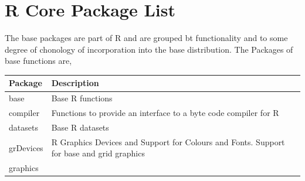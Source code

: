 \documentclass[]{book}
\theoremstyle{definition}
\theoremstyle{definition}
\theoremstyle{definition}
\theoremstyle{remark}
\begin{document}
\section{R Core Package List}\label{r-core-package-list}

The base packages are part of R and are grouped bt functionality and to
some degree of chonology of incorporation into the base distribution.
The Packages of base functions are,

\begin{longtable}[]{@{}ll@{}}
\toprule
\begin{minipage}[b]{0.13\columnwidth}\raggedright\strut
Package\strut
\end{minipage} & \begin{minipage}[b]{0.81\columnwidth}\raggedright\strut
Description\strut
\end{minipage}\tabularnewline
\midrule
\endhead
\begin{minipage}[t]{0.13\columnwidth}\raggedright\strut
base\strut
\end{minipage} & \begin{minipage}[t]{0.81\columnwidth}\raggedright\strut
Base R functions\strut
\end{minipage}\tabularnewline
\begin{minipage}[t]{0.13\columnwidth}\raggedright\strut
compiler\strut
\end{minipage} & \begin{minipage}[t]{0.81\columnwidth}\raggedright\strut
Functions to provide an interface to a byte code compiler for R\strut
\end{minipage}\tabularnewline
\begin{minipage}[t]{0.13\columnwidth}\raggedright\strut
datasets\strut
\end{minipage} & \begin{minipage}[t]{0.81\columnwidth}\raggedright\strut
Base R datasets\strut
\end{minipage}\tabularnewline
\begin{minipage}[t]{0.13\columnwidth}\raggedright\strut
grDevices\strut
\end{minipage} & \begin{minipage}[t]{0.81\columnwidth}\raggedright\strut
R Graphics Devices and Support for Colours and Fonts. Support for base
and grid graphics\strut
\end{minipage}\tabularnewline
\begin{minipage}[t]{0.13\columnwidth}\raggedright\strut
graphics\strut
\end{minipage} & \begin{minipage}[t]{0.81\columnwidth}\raggedright\strut

\end{minipage}
\end{longtable}
\end{document}
